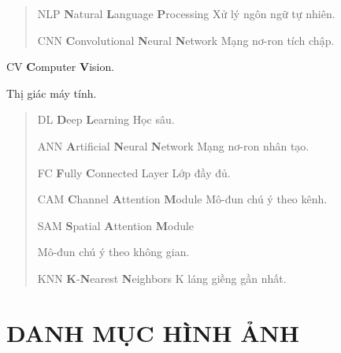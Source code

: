\documentclass[
]{article}
\begin{document}
\begin{quote}
NLP \textbf{N}atural \textbf{L}anguage \textbf{P}rocessing Xử lý ngôn
ngữ tự nhiên.

CNN \textbf{C}onvolutional \textbf{N}eural \textbf{N}etwork Mạng nơ-ron
tích chập.
\end{quote}

CV \textbf{C}omputer \textbf{V}ision.

Thị giác máy tính.

\begin{quote}
DL \textbf{D}eep \textbf{L}earning Học sâu.

ANN \textbf{A}rtificial \textbf{N}eural \textbf{N}etwork Mạng nơ-ron
nhân tạo.

FC \textbf{F}ully \textbf{C}onnected Layer Lớp đầy đủ.

CAM \textbf{C}hannel \textbf{A}ttention \textbf{M}odule Mô-đun chú ý
theo kênh.

SAM \textbf{S}patial \textbf{A}ttention \textbf{M}odule

Mô-đun chú ý theo không gian.

KNN \textbf{K}-\textbf{N}earest \textbf{N}eighbors K láng giềng gần
nhất.
\end{quote}

\hypertarget{danh-mux1ee5c-huxecnh-ux1ea3nh}{%
\section{DANH MỤC HÌNH ẢNH}\label{danh-mux1ee5c-huxecnh-ux1ea3nh}}
\end{document}
